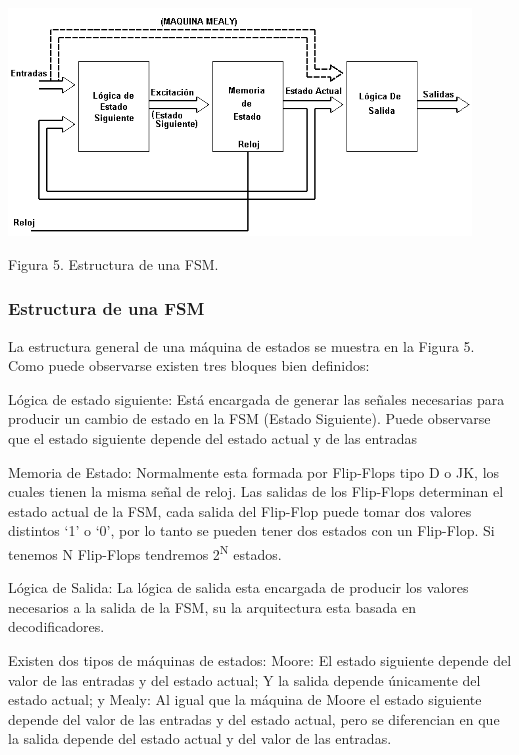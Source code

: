  \includegraphics[width=12.27cm,height=6.04cm]{./images/FSM-img5.png} 

{\centering Figura 5. Estructura de una FSM. \par}

\subsubsection[Estructura de una FSM]{ Estructura de una FSM}
La estructura general de una máquina de estados se muestra en la  Figura 5. Como puede observarse existen tres bloques bien definidos:

Lógica de estado siguiente: Está encargada de generar las señales necesarias para producir un cambio de estado en la FSM (Estado Siguiente). Puede observarse que el estado siguiente depende del estado actual y de las entradas 

Memoria de Estado: Normalmente esta formada por Flip-Flops tipo D o JK, los cuales tienen la misma señal de reloj. Las salidas de los Flip-Flops determinan el estado actual de la FSM, cada salida del Flip-Flop puede tomar dos valores distintos {\textquoteleft}1{\textquoteright} o
{\textquoteleft}0{\textquoteright}, por lo tanto se pueden tener dos estados con un Flip-Flop. Si tenemos N Flip-Flops tendremos 2\textsuperscript{N} estados.

Lógica de Salida: La lógica de salida esta encargada de producir los valores necesarios a la salida de la FSM, su la arquitectura esta basada en decodificadores. 

Existen dos tipos de máquinas de estados: Moore: El estado siguiente depende del valor de las entradas y del estado actual; Y la salida depende únicamente del estado actual; y Mealy: Al igual que la máquina de Moore el estado siguiente depende del valor de las entradas y del estado actual, pero se diferencian en que la salida depende del estado actual y del valor de las entradas.

